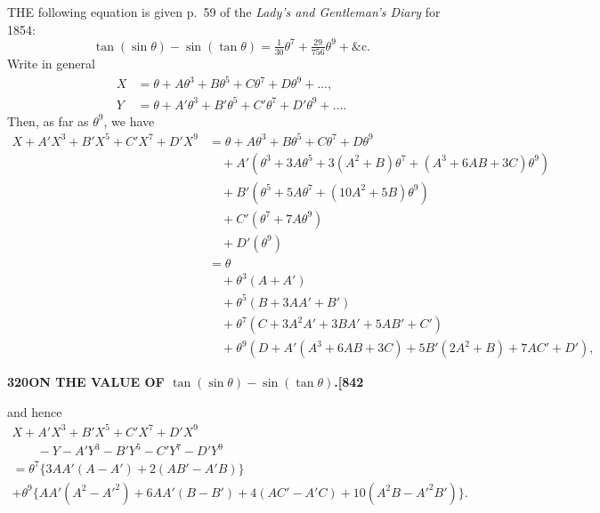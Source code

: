 \documentclass[11pt,a4paper]{book}
\begin{document}
\bigskip

\noindent THE following equation is given p.\ 59 of the \textit{Lady's and Gentleman's Diary} for 1854:
\[
\tan(\sin\theta) - \sin(\tan\theta) = \tfrac{1}{30}\theta^7 + \tfrac{29}{756}\theta^9 + \&\text{c.}
\]
Write in general
\begin{align*}
X &= \theta + A\theta^3 + B\theta^5 + C\theta^7 + D\theta^9 + \ldots, \\
Y &= \theta + A'\theta^3 + B'\theta^5 + C'\theta^7 + D'\theta^9 + \ldots.
\end{align*}
Then, as far as $\theta^9$, we have
\begin{align*}
X + A'X^3 + B'X^5 + C'X^7 + D'X^9 &= \theta + A\theta^3 + B\theta^5 + C\theta^7 + D\theta^9 \\
&\quad + A'(\theta^3 + 3A\theta^5 + 3(A^2 + B)\theta^7 + (A^3 + 6AB + 3C)\theta^9) \\
&\quad + B'(\theta^5 + 5A\theta^7 + (10A^2 + 5B)\theta^9) \\
&\quad + C'(\theta^7 + 7A\theta^9) \\
&\quad + D'(\theta^9) \\
&= \theta \\
&\quad + \theta^3(A + A') \\
&\quad + \theta^5(B + 3AA' + B') \\
&\quad + \theta^7(C + 3A^2A' + 3BA' + 5AB' + C') \\
&\quad + \theta^9(D + A'(A^3 + 6AB + 3C) + 5B'(2A^2 + B) + 7AC' + D'),
\end{align*}

\newpage
\setcounter{page}{320}

\noindent\textbf{320}\hfill\textbf{ON THE VALUE OF $\tan(\sin\theta) - \sin(\tan\theta)$.}\hfill\textbf{[842}

\bigskip

\noindent and hence
\begin{align*}
X + A'X^3 + B'X^5 + C'X^7 + D'X^9 &\\
\qquad - Y - A'Y^3 - B'Y^5 - C'Y^7 - D'Y^9 &\\
= \theta^7\{3AA'(A - A') + 2(AB' - A'B)\} &\\
+ \theta^9\{AA'(A^2 - A'^2) + 6AA'(B - B') + 4(AC' - A'C) + 10(A^2B - A'^2B')\}. &
\end{align*}
\end{document}
